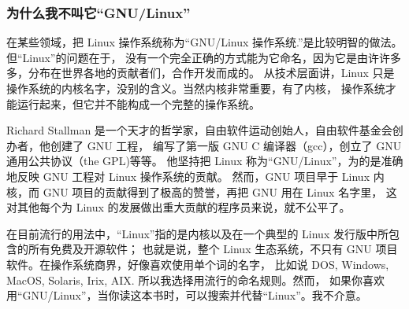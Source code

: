 \fboxrule=6pt \fboxsep=4pt
\begin{colorboxed}[boxcolor=lightgray,bgcolor=white]
 \subsubsection{为什么我不叫它“GNU/Linux”}

\par 在某些领域，把 Linux 操作系统称为“GNU/Linux 操作系统.”是比较明智的做法。但“Linux”的问题在于， 没有一个完全正确的方式能为它命名，因为它是由许许多多，分布在世界各地的贡献者们，合作开发而成的。 从技术层面讲，Linux 只是操作系统的内核名字，没别的含义。当然内核非常重要，有了内核， 操作系统才能运行起来，但它并不能构成一个完整的操作系统。

\par Richard Stallman 是一个天才的哲学家，自由软件运动创始人，自由软件基金会创办者，他创建了 GNU 工程， 编写了第一版 GNU C 编译器（gcc），创立了 GNU 通用公共协议（the GPL)等等。 他坚持把 Linux 称为“GNU/Linux”，为的是准确地反映 GNU 工程对 Linux 操作系统的贡献。 然而，GNU 项目早于 Linux 内核，而 GNU 项目的贡献得到了极高的赞誉，再把 GNU 用在 Linux 名字里， 这对其他每个为 Linux 的发展做出重大贡献的程序员来说，就不公平了。

\par 在目前流行的用法中，“Linux”指的是内核以及在一个典型的 Linux 发行版中所包含的所有免费及开源软件； 也就是说，整个 Linux 生态系统，不只有 GNU 项目软件。在操作系统商界，好像喜欢使用单个词的名字， 比如说 DOS, Windows, MacOS, Solaris, Irix, AIX. 所以我选择用流行的命名规则。然而， 如果你喜欢用“GNU/Linux”，当你读这本书时，可以搜索并代替“Linux”。我不介意。
\end{colorboxed}


